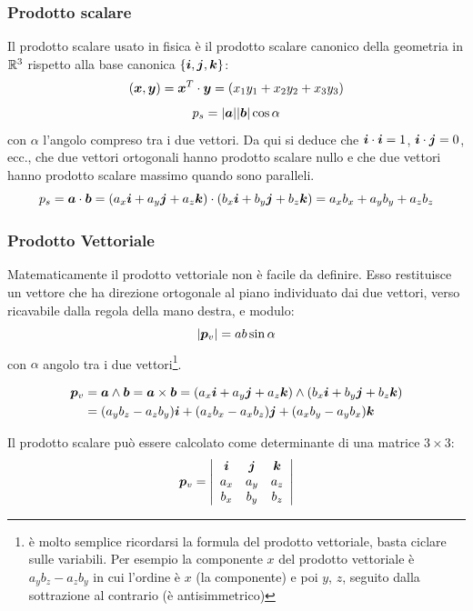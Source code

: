 \subsubsection{Prodotto scalare}
Il prodotto scalare usato in fisica è il prodotto scalare canonico della geometria in $\mathbb{R}^3$ rispetto alla base canonica $\{\boldsymbol{i},\boldsymbol{j},\boldsymbol{k}\}$:
\begin{equation*}\left(\boldsymbol{x},\boldsymbol{y}\right)=\boldsymbol{x}^T\cdot\boldsymbol{y}=(x_1y_1+x_2y_2+x_3y_3)\end{equation*}
\begin{equation*}p_s=|\boldsymbol{a}||\boldsymbol{b}| \cos \alpha\end{equation*}
 con $\alpha$ l'angolo compreso tra i due vettori. Da qui si deduce che $\boldsymbol{i} \cdot \boldsymbol{i}=1$, $\boldsymbol{i}
\cdot \boldsymbol{j}=0$, ecc., che due vettori ortogonali hanno prodotto scalare nullo e che due vettori hanno prodotto scalare massimo quando sono paralleli.
$$p_s=\boldsymbol{a} \cdot \boldsymbol{b}=(a_x\boldsymbol{i}+a_y\boldsymbol{j}+a_z\boldsymbol{k})\cdot(b_x\boldsymbol{i}+b_y\boldsymbol{j}+b_z\boldsymbol{k})=a_xb_x+a_yb_y+a_zb_z$$
\subsubsection{Prodotto Vettoriale}
Matematicamente il prodotto vettoriale non è facile da definire. Esso restituisce un vettore che ha direzione ortogonale al piano individuato dai due vettori, verso ricavabile dalla regola della mano destra, e modulo:
\begin{equation*}|\boldsymbol{p}_v|=ab\sin \alpha\end{equation*} con $\alpha$ angolo tra i due vettori\footnote{è molto semplice ricordarsi la formula del prodotto vettoriale, basta ciclare sulle variabili. Per esempio la componente $x$ del prodotto vettoriale è $a_yb_z-a_zb_y$ in cui l'ordine è $x$ (la componente) e poi $y$, $z$, seguito dalla sottrazione al contrario (è antisimmetrico)}.


\begin{align*}
\boldsymbol{p}_v&=\boldsymbol{a} \wedge \boldsymbol{b}=\boldsymbol{a} \times \boldsymbol{b}=(a_x\boldsymbol{i}+a_y\boldsymbol{j}+a_z\boldsymbol{k})\wedge(b_x\boldsymbol{i}+b_y\boldsymbol{j}+b_z\boldsymbol{k})\\
&=(a_yb_z-a_zb_y)\boldsymbol{i}+(a_zb_x-a_xb_z)\boldsymbol{j}+(a_xb_y-a_yb_x)\boldsymbol{k}
\end{align*}

Il prodotto scalare può essere calcolato come determinante di una matrice $3\times 3$:
$$\boldsymbol{p}_v=
\left| \begin{array}{ccc} \boldsymbol{i} & \boldsymbol{j} & \boldsymbol{k}\\
a_x & a_y & a_z\\
b_x & b_y& b_z
 \end{array} \right|$$

